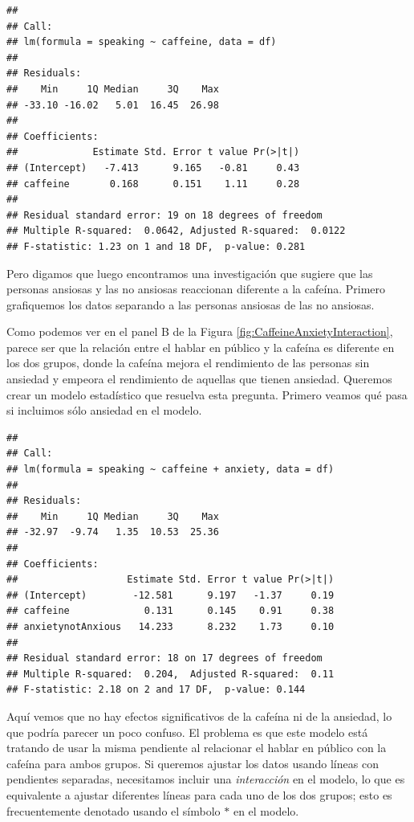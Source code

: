 \documentclass[
  12pt,
]{book}
\begin{document}
\begin{verbatim}
## 
## Call:
## lm(formula = speaking ~ caffeine, data = df)
## 
## Residuals:
##    Min     1Q Median     3Q    Max 
## -33.10 -16.02   5.01  16.45  26.98 
## 
## Coefficients:
##             Estimate Std. Error t value Pr(>|t|)
## (Intercept)   -7.413      9.165   -0.81     0.43
## caffeine       0.168      0.151    1.11     0.28
## 
## Residual standard error: 19 on 18 degrees of freedom
## Multiple R-squared:  0.0642, Adjusted R-squared:  0.0122 
## F-statistic: 1.23 on 1 and 18 DF,  p-value: 0.281
\end{verbatim}

Pero digamos que luego encontramos una investigación que sugiere que las personas ansiosas y las no ansiosas reaccionan diferente a la cafeína. Primero grafiquemos los datos separando a las personas ansiosas de las no ansiosas.

Como podemos ver en el panel B de la Figura \ref{fig:CaffeineAnxietyInteraction}, parece ser que la relación entre el hablar en público y la cafeína es diferente en los dos grupos, donde la cafeína mejora el rendimiento de las personas sin ansiedad y empeora el rendimiento de aquellas que tienen ansiedad. Queremos crear un modelo estadístico que resuelva esta pregunta. Primero veamos qué pasa si incluimos sólo ansiedad en el modelo.

\begin{verbatim}
## 
## Call:
## lm(formula = speaking ~ caffeine + anxiety, data = df)
## 
## Residuals:
##    Min     1Q Median     3Q    Max 
## -32.97  -9.74   1.35  10.53  25.36 
## 
## Coefficients:
##                   Estimate Std. Error t value Pr(>|t|)
## (Intercept)        -12.581      9.197   -1.37     0.19
## caffeine             0.131      0.145    0.91     0.38
## anxietynotAnxious   14.233      8.232    1.73     0.10
## 
## Residual standard error: 18 on 17 degrees of freedom
## Multiple R-squared:  0.204,  Adjusted R-squared:  0.11 
## F-statistic: 2.18 on 2 and 17 DF,  p-value: 0.144
\end{verbatim}

Aquí vemos que no hay efectos significativos de la cafeína ni de la ansiedad, lo que podría parecer un poco confuso. El problema es que este modelo está tratando de usar la misma pendiente al relacionar el hablar en público con la cafeína para ambos grupos. Si queremos ajustar los datos usando líneas con pendientes separadas, necesitamos incluir una \emph{interacción} en el modelo, lo que es equivalente a ajustar diferentes líneas para cada uno de los dos grupos; esto es frecuentemente denotado usando el símbolo \(*\) en el modelo.
\end{document}
